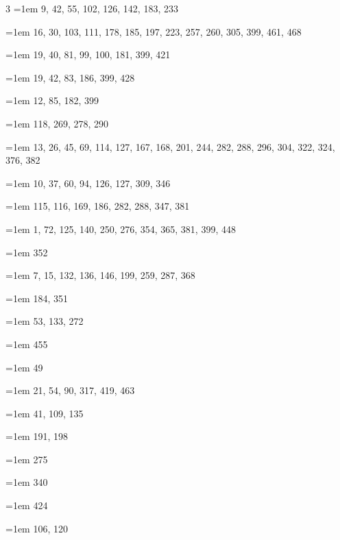 \begin{multicols}{3}
\hangindent=1em  9, 42, 55, 102, 126, 142, 183, 233\par
\hangindent=1em  16, 30, 103, 111, 178, 185, 197, 223, 257, 260, 305, 399, 461, 468\par
\hangindent=1em  19, 40, 81, 99, 100, 181, 399, 421\par
\hangindent=1em  19, 42, 83, 186, 399, 428\par
\hangindent=1em  12, 85, 182, 399\par
\hangindent=1em  118, 269, 278, 290\par
\hangindent=1em  13, 26, 45, 69, 114, 127, 167, 168, 201, 244, 282, 288, 296, 304, 322, 324, 376, 382\par
\hangindent=1em  10, 37, 60, 94, 126, 127, 309, 346\par
\hangindent=1em  115, 116, 169, 186, 282, 288, 347, 381\par
\hangindent=1em  1, 72, 125, 140, 250, 276, 354, 365, 381, 399, 448\par
\hangindent=1em  352\par
\hangindent=1em  7, 15, 132, 136, 146, 199, 259, 287, 368\par
\hangindent=1em  184, 351\par
\hangindent=1em  53, 133, 272\par
\hangindent=1em  455\par
\hangindent=1em  49\par
\hangindent=1em  21, 54, 90, 317, 419, 463\par
\hangindent=1em  41, 109, 135\par
\hangindent=1em  191, 198\par
\hangindent=1em  275\par
\hangindent=1em  340\par
\hangindent=1em  424\par
\hangindent=1em  106, 120\par\end{multicols}
